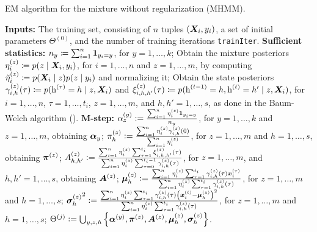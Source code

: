 \begin{algorithm}
	\caption{EM algorithm for the mixture without regularization (MHMM).}
	\label{alg:mhmm}
	\begin{algorithmic}[1]
		\State \textbf{Inputs:} The training set, consisting of $n$ tuples $({\bm{X}}_i,y_i)$, a set of initial parameters $\Theta^{(0)}$, and the number of training iterations \texttt{trainIter}.
		\vspace{0.3cm}
		\vspace{0.3cm}
		\State \textbf{Sufficient statistics:}
		\vspace{0.3cm}
		\Indent
			\State $n_y \coloneqq \sum_{i=1}^n \bm{1}_{y_i=y}$, for $y=1,\dots,k$;
			\vspace{0.3cm}
			\State Obtain the mixture posteriors $\eta^{(z)}_{i} \coloneqq p(z \mid {\bm{X}}_i, y_i)$, for $i=1,\dots,n$ and $z=1,\dots,m$, by computing  $\tilde{\eta}^{(z)}_{i} \coloneqq p({\bm{X}}_i \mid z)p(z \mid y_i)$ and normalizing it;
			\vspace{0.3cm}
			\State Obtain the state posteriors $\gamma^{(z)}_{i,h}(\tau) \coloneqq p({\textnormal{h}}^{(\tau)}=h \mid z, {\bm{X}}_i)$ and $\xi^{(z)}_{i,h,h'}(\tau) \coloneqq p({\textnormal{h}}^{(t-1)}=h, {\textnormal{h}}^{(t)}=h' \mid z, {\bm{X}}_i)$, for $i=1,\dots,n$, $\tau=1,\dots,t_i$, $z=1,\dots,m$, and $h,h'=1,\dots,s$, as done in the Baum-Welch algorithm (\citet{Baum1972}).
			\vspace{0.3cm}
		\EndIndent
		\State \textbf{M-step:}
		\vspace{0.3cm}
		\Indent
			\State ${\alpha}^{(y)}_{z} := \frac{\sum_{i=1}^n \eta^{(z)}_{i} \bm{1}_{y_i=y}}{n_y}$, for $y=1,\dots,k$ and $z=1,\dots,m$, obtaining ${\bm{\alpha}}_y$;
			\vspace{0.3cm}
			\State ${\pi}^{(z)}_h := \frac{\sum_{i=1}^n \eta^{(z)}_{i} \gamma^{(z)}_{i,h}(0)}{\sum_{i=1}^n \eta^{(z)}_{i}}$, for $z=1,\dots,m$ and $h=1,\dots,s$, obtaining ${\bm{\pi}}^{(z)}$;
			\vspace{0.3cm} 
			\State ${A}^{(z)}_{h,h'} := \frac{\sum_{i=1}^n \eta^{(z)}_{i} \sum_{\tau=1}^{t_i} \xi^{(z)}_{i,h,h'}(\tau)}{\sum_{i=1}^n \eta^{(z)}_{i} \sum_{\tau=0}^{t_i-1} \gamma^{(z)}_{i,h}(\tau)}$, for $z=1,\dots,m$, and $h,h'=1,\dots,s$, obtaining ${\bm{A}}^{(z)}$;
			\vspace{0.3cm}
			\State ${\bm{\mu}}^{(z)}_h := \frac{\sum_{i=1}^n \eta^{(z)}_{i} \sum_{\tau=1}^{t_i} \gamma^{(z)}_{i,h}(\tau) {\bm{x}}_i^{(\tau)}} {\sum_{i=1}^n \eta^{(z)}_{i} \sum_{\tau=1}^{t_i} \gamma^{(z)}_{i,h}(\tau)}$, for $z=1,\dots,m$ and $h=1,\dots,s$;
			\vspace{0.3cm}
			\State ${{\bm{\sigma}}^{(z)}_h}^2 := \frac{\sum_{i=1}^n \eta^{(z)}_{i} \sum_{\tau=1}^{t_i} \gamma^{(z)}_{i,h}(\tau) \left({\bm{x}}_i^{(t)} - {\bm{\mu}}^{(z)}_h\right)^2} {\sum_{i=1}^n \eta^{(z)}_{i} \sum_{\tau=1}^{t_i} \gamma^{(z)}_{i,h}(\tau)}$, for $z=1,\dots,m$ and $h=1,\dots,s$;
			\vspace{0.3cm}
			\State $\Theta^{(j)} := \bigcup_{y,z,h} \left\lbrace {\bm{\alpha}}^{(y)}, {\bm{\pi}}^{(z)}, {\bm{A}}^{(z)}, {\bm{\mu}}^{(z)}_h, {\bm{\sigma}}^{(z)}_h \right\rbrace$.
			\vspace{0.3cm}
		\EndIndent
		\EndFor  
	\end{algorithmic}
\end{algorithm}

